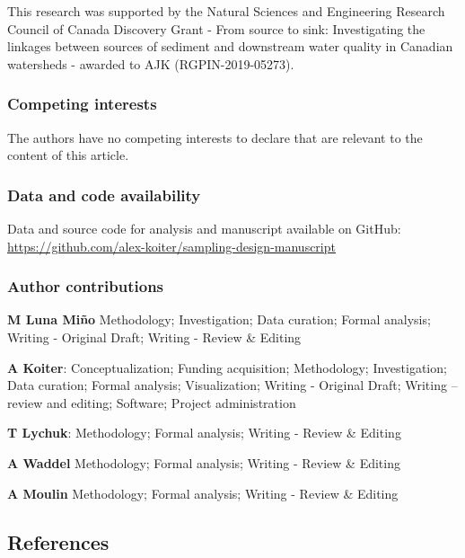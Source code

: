 \documentclass[
  number]{elsarticle}
\begin{document}
This research was supported by the Natural Sciences and Engineering
Research Council of Canada Discovery Grant - From source to sink:
Investigating the linkages between sources of sediment and downstream
water quality in Canadian watersheds - awarded to AJK
(RGPIN-2019-05273).

\subsubsection*{Competing interests}\label{competing-interests}

The authors have no competing interests to declare that are relevant to
the content of this article.

\subsubsection*{Data and code
availability}\label{data-and-code-availability}

Data and source code for analysis and manuscript available on GitHub:
\url{https://github.com/alex-koiter/sampling-design-manuscript}

\subsubsection*{Author contributions}\label{author-contributions}

\textbf{M Luna Miño} Methodology; Investigation; Data curation; Formal
analysis; Writing - Original Draft; Writing - Review \& Editing

\textbf{A Koiter}: Conceptualization; Funding acquisition; Methodology;
Investigation; Data curation; Formal analysis; Visualization; Writing -
Original Draft; Writing -- review and editing; Software; Project
administration

\textbf{T Lychuk}: Methodology; Formal analysis; Writing - Review \&
Editing

\textbf{A Waddel} Methodology; Formal analysis; Writing - Review \&
Editing

\textbf{A Moulin} Methodology; Formal analysis; Writing - Review \&
Editing

\subsection*{References}\label{references}
\end{document}
